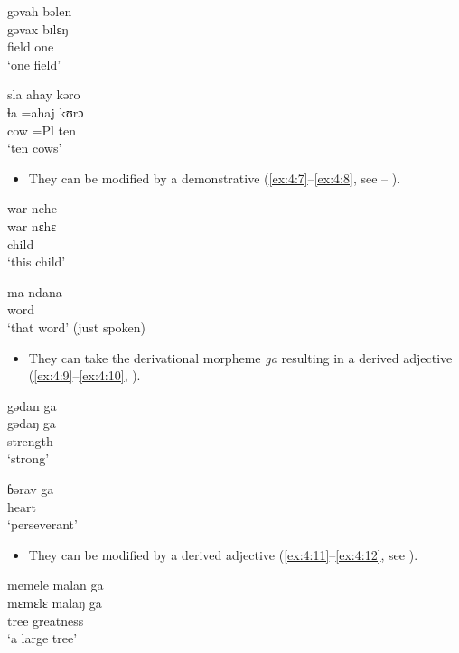 \ea \label{ex:4:5}
gəvah  bəlen\\
\gll  gəvax  bɪlɛŋ\\
      field  one\\
\glt  ‘one field’
\z

\ea \label{ex:4:6}
sla  ahay  kəro\\
\gll  ɬa    =ahaj  kʊrɔ\\
      cow    =Pl  ten\\
\glt  ‘ten cows’
\z

\begin{itemize}
\item They can be modified by a demonstrative (\ref{ex:4:7}--\ref{ex:4:8}, see -- ).
\end{itemize}

\ea \label{ex:4:7}
war  nehe\\
\gll  war    nɛhɛ\\
      child  {\DEM}\\
\glt  ‘this child’
\z

\ea \label{ex:4:8}
ma    ndana\\
      word  {\DEM}\\
\glt  ‘that word’ (just spoken)
\z

\begin{itemize}
\item They can take the derivational morpheme \textit{ga}  resulting in a derived adjective (\ref{ex:4:9}--\ref{ex:4:10}, ).
\end{itemize}

\ea \label{ex:4:9}
gədan  ga\\
\gll  gədaŋ  ga\\
      strength  {\ADJ}\\
\glt  ‘strong’
\z

\ea \label{ex:4:10}
ɓərav    ga\\
     heart  {\ADJ}\\
\glt  ‘perseverant’
\z

\begin{itemize}
\item They can be modified by a derived adjective (\ref{ex:4:11}--\ref{ex:4:12}, see ).
\end{itemize}

\ea \label{ex:4:11}
memele  malan  ga\\
\gll  mɛmɛlɛ  malaŋ    ga\\
      tree    greatness  {\ADJ}\\
\glt  ‘a large tree’
\z

